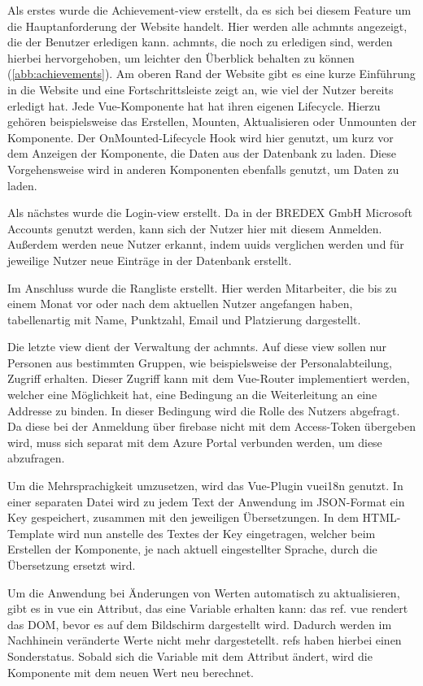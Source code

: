 \documentclass[11pt]{article}
\begin{document}
Als erstes wurde die Achievement-\Gls{view} erstellt, da es sich bei diesem Feature um die
Hauptanforderung der Website handelt. Hier werden alle \glspl{achmnt} angezeigt, die
der Benutzer erledigen kann. 
\Glspl{achmnt}, die noch zu erledigen sind, werden hierbei hervorgehoben, um leichter den
Überblick behalten zu können (\autoref{abb:achievements}).
Am oberen Rand der Website gibt es eine kurze Einführung in die Website und eine Fortschrittsleiste
zeigt an, wie viel der Nutzer bereits erledigt hat.
Jede Vue-Komponente hat
hat ihren eigenen Lifecycle. Hierzu gehören beispielsweise das Erstellen, Mounten,
Aktualisieren oder Unmounten der Komponente. Der OnMounted-Lifecycle Hook wird hier genutzt,
um kurz vor dem Anzeigen der Komponente, die Daten aus der Datenbank zu laden.
Diese Vorgehensweise wird in anderen Komponenten ebenfalls genutzt, um Daten zu laden. 

Als nächstes wurde die Login-\Gls{view} erstellt. Da in der BREDEX GmbH Microsoft Accounts
genutzt werden, kann sich der Nutzer hier mit diesem Anmelden. Außerdem werden neue Nutzer
erkannt, indem \glspl{uuid} verglichen werden und für jeweilige Nutzer neue Einträge in der
Datenbank erstellt.

Im Anschluss wurde die Rangliste erstellt. Hier werden Mitarbeiter, die bis zu einem Monat vor oder
nach dem aktuellen Nutzer angefangen haben, tabellenartig mit Name, Punktzahl, Email und Platzierung dargestellt. %

Die letzte \Gls{view} dient der Verwaltung der \glspl{achmnt}. Auf diese \Gls{view} sollen nur Personen
aus bestimmten Gruppen, wie beispielsweise der Personalabteilung, Zugriff erhalten. Dieser Zugriff
kann mit dem Vue-Router implementiert werden, welcher eine Möglichkeit hat, eine Bedingung
an die Weiterleitung an eine Addresse zu binden. In dieser Bedingung wird die Rolle des
Nutzers abgefragt. Da diese bei der Anmeldung über \gls{firebase} nicht mit dem Access-Token
übergeben wird, muss sich separat mit dem Azure Portal verbunden werden, um diese abzufragen.

Um die Mehrsprachigkeit umzusetzen, wird das Vue-Plugin \gls{vuei18n} genutzt.
In einer separaten Datei wird zu jedem Text der Anwendung im JSON-Format ein Key gespeichert, zusammen mit
den jeweiligen Übersetzungen. In dem HTML-Template wird nun anstelle des Textes der Key eingetragen,
welcher beim Erstellen der Komponente, je nach aktuell eingestellter Sprache, durch die Übersetzung
ersetzt wird.

Um die Anwendung bei Änderungen von Werten automatisch zu aktualisieren, gibt es in \Gls{vue} ein Attribut, das eine
Variable erhalten kann: das \Gls{ref}. \Gls{vue} rendert das DOM, bevor es auf dem Bildschirm dargestellt wird.
Dadurch werden im Nachhinein veränderte Werte nicht mehr dargestetellt. \Glspl{ref} haben hierbei einen Sonderstatus.
Sobald sich die Variable mit dem Attribut ändert, wird die Komponente mit dem neuen Wert neu berechnet.
\end{document}
